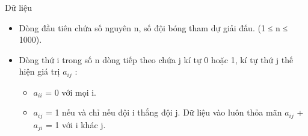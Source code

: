 Dữ liệu
\begin{itemize}
	\item Dòng đầu tiên chứa số nguyên n, số đội bóng tham dự giải đấu. (1 ≤ n ≤ 1000).
	\item Dòng thứ i trong số n dòng tiếp theo chứa j kí tự 0 hoặc 1, kí tự thứ j thế hiện giá trị $a_{ij}$ :
\begin{itemize}
	\item $a_{ii}$ = 0 với mọi i.
	\item $a_{ij}$ = 1 nếu và chỉ nếu đội i thắng đội j. Dữ liệu vào luôn thỏa mãn $a_{ij}$ +$a_{ji}$ = 1 với i khác j.
\end{itemize}
\end{itemize}